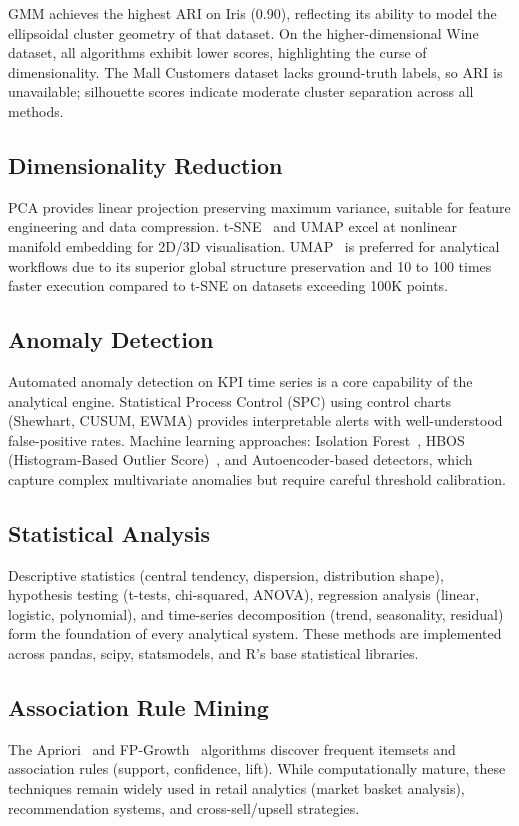 \documentclass[12pt, a4paper]{article}
\begin{document}
GMM achieves the highest ARI on Iris (0.90), reflecting its ability to model the ellipsoidal cluster geometry of that dataset. On the higher-dimensional Wine dataset, all algorithms exhibit lower scores, highlighting the curse of dimensionality. The Mall Customers dataset lacks ground-truth labels, so ARI is unavailable; silhouette scores indicate moderate cluster separation across all methods.

\subsection{Dimensionality Reduction}
PCA provides linear projection preserving maximum variance, suitable for feature engineering and data compression. t-SNE~\citep{vandermaaten2008tsne} and UMAP excel at nonlinear manifold embedding for 2D/3D visualisation. UMAP~\citep{mcinnes2018umap} is preferred for analytical workflows due to its superior global structure preservation and 10 to 100 times faster execution compared to t-SNE on datasets exceeding 100K points.

\subsection{Anomaly Detection}
Automated anomaly detection on KPI time series is a core capability of the analytical engine. Statistical Process Control (SPC) using control charts (Shewhart, CUSUM, EWMA) provides interpretable alerts with well-understood false-positive rates. Machine learning approaches: Isolation Forest~\citep{liu2008isolation}, HBOS (Histogram-Based Outlier Score)~\citep{goldstein2012hbos}, and Autoencoder-based detectors, which capture complex multivariate anomalies but require careful threshold calibration.

\subsection{Statistical Analysis}
Descriptive statistics (central tendency, dispersion, distribution shape), hypothesis testing (t-tests, chi-squared, ANOVA), regression analysis (linear, logistic, polynomial), and time-series decomposition (trend, seasonality, residual) form the foundation of every analytical system. These methods are implemented across pandas, scipy, statsmodels, and R's base statistical libraries.

\subsection{Association Rule Mining}
The Apriori~\citep{agrawal1994apriori} and FP-Growth~\citep{han2000fpgrowth} algorithms discover frequent itemsets and association rules (support, confidence, lift). While computationally mature, these techniques remain widely used in retail analytics (market basket analysis), recommendation systems, and cross-sell/upsell strategies.
\end{document}
